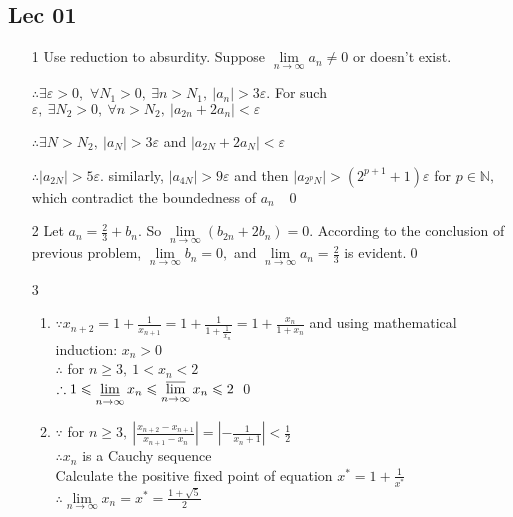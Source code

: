 
\subsection{Lec 01}
\begin{enumerate}[1]
	\item[1]
	Use reduction to absurdity. Suppose \(\lim \limits_{n \rightarrow \infty} a_{n} \neq 0\) or doesn't exist.
	\par \(\therefore \exists \varepsilon>0,\)
	\(\forall N_{1}>0,\  \exists n>N_{1},\ \left|a_{n}\right|>3 \varepsilon .\) For such \(\varepsilon,\ \exists N_{2}>0,\ \forall n>N_{2},\ \left|a_{2 n}+2 a_{n}\right|<\varepsilon\)
	\par \(\therefore \exists N>N_{2},\ \left|a_{N}\right|>3 \varepsilon\) and \(\left|a_{2 N}+2 a_{N}\right|<\varepsilon \) 
	\par \(\therefore \left|a_{2 N}\right|>5 \varepsilon .\) similarly,
	\(\left|a_{4 N}\right|>9 \varepsilon\) and then \(\left|a_{2^{p} N}\right|>\left(2^{p+1}+1\right) \varepsilon\) for \(p \in \mathbb{N},\) which contradict the boundedness of \(a_{n} \)
	$\qedhere$ \qed
	
	\item[2]
	Let \(a_{n}=\frac{2}{3}+b_{n} .\) So \(\lim \limits_{n \rightarrow \infty}\left(b_{2 n}+2 b_{n}\right)=0 .\) According to the conclusion of
	previous problem, \(\lim \limits_{n \rightarrow \infty} b_{n}=0,\) and \(\lim \limits_{n \rightarrow \infty} a_{n}=\frac{2}{3}\) is evident.\qed

	\item[3]
\begin{enumerate}[(1)]
	\item 
	\(\because x_{n+2}=1+\frac{1}{x_{n+1}}=1+\frac{1}{1+\frac{1}{x_{n}}}=1+\frac{x_{n}}{1+x_{n}}\) and using mathematical induction: \(x_{n}>0\)\\
	\(\therefore\) for \(n \geqslant 3,\ 1<x_{n}<2\)\\
	\(\therefore 1 \leqslant \varliminf \limits_{n \rightarrow \infty} x_{n} \leqslant \varlimsup \limits_{n \rightarrow \infty} x_{n}  \leqslant 2\) \qed

	\item 
	\(\because\) for \(n \geqslant 3,\ \left|\frac{x_{n+2}-x_{n+1}}{x_{n+1}-x_{n}}\right|=\left|-\frac{1}{x_{n}+1}\right|<\frac{1}{2}\)\\
	\(\therefore x_{n}\) is a Cauchy sequence	\\
	Calculate the positive fixed point of equation \(x^{*}=1+\frac{1}{x^{*}}\)\\
	\(\therefore \lim \limits_{n \rightarrow \infty} x_{n}=x^{*}=\frac{1+\sqrt{5}}{2}\)



\end{enumerate}
\end{enumerate}
